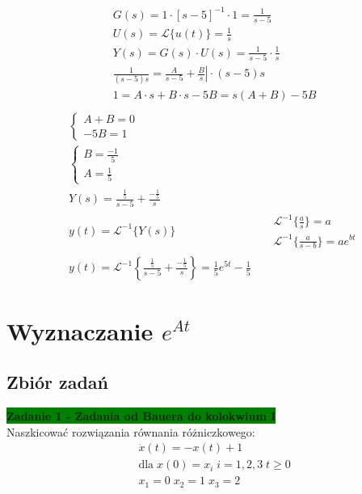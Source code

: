 \documentclass[a4paper,11pt]{article}
\begin{document}
\begin{equation*}
\begin{aligned}
& G(s) = 1 \cdot [s - 5]^{-1} \cdot 1 = \frac{1}{s-5} \\
& U(s) = \mathscr{L}\{u(t)\} = \frac{1}{s} \\
& Y(s) = G(s) \cdot U(s) = \frac{1}{s-5} \cdot \frac{1}{s} \\
& \frac{1}{(s-5)s} = \left. \frac{A}{s-5} + \frac{B}{s} \right| \cdot (s-5)s \\
& 1 = A \cdot s + B \cdot s - 5B = s(A+B) - 5B \\
\end{aligned}
\end{equation*}
\begin{equation*}
\begin{aligned}
& \begin{cases}
A+B = 0 \\
-5B = 1
\end{cases} \\
& \begin{cases}
B = \frac{-1}{5} \\
A = \frac{1}{5}
\end{cases} \\
& Y(s) = \frac{\frac15}{s-5} + \frac{-\frac15}{s} \\
& y(t) = \mathscr{L}^{-1}\{Y(s)\}
& \begin{array}{rl}
	& \mathscr{L}^{-1}\{\frac{a}{s}\} = a \\
	& \mathscr{L}^{-1}\{\frac{a}{s-b}\} = ae^{bt}
\end{array} \\
& y(t) = \mathscr{L}^{-1}\left\{ \frac{\frac15}{s-5} + \frac{-\frac15}{s} \right\} = \boxed{ \frac15e^{5t} - \frac15 }
\end{aligned}
\end{equation*}


\newpage
\section{Wyznaczanie \( e^{At} \)}
\subsection{Zbiór zadań}
\begin{framed}
\textbf{\colorbox{green}{Zadanie 1 - Zadania od Bauera do kolokwium I }} \\ 
Naszkicować rozwiązania równania różniczkowego:
\begin{align*}
&\dot{x}(t)=-x(t)+1 \\
&\text{dla} \; x(0) = x_i \; i = 1,2,3 \; t \geq 0 \\
&x_1 = 0 \; x_2 = 1 \; x_3 = 2 
\end{align*}
\end{framed}
\end{document}
